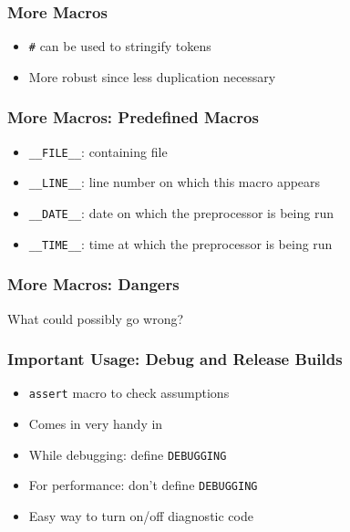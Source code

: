 \documentclass{../ucll-slides}
\begin{document}
\begin{frame}
  \frametitle{More Macros}
  \begin{itemize}
    \item {\tt \#} can be used to stringify tokens
    \item More robust since less duplication necessary
  \end{itemize}
  \begin{overprint}
  \end{overprint}
\end{frame}

\begin{frame}
  \frametitle{More Macros: Predefined Macros}
  \begin{itemize}
    \item {\tt \_\_FILE\_\_}: containing file
    \item {\tt \_\_LINE\_\_}: line number on which this macro appears
    \item {\tt \_\_DATE\_\_}: date on which the preprocessor is being run
    \item {\tt \_\_TIME\_\_}: time at which the preprocessor is being run
  \end{itemize}
  \begin{overprint}
  \end{overprint}
\end{frame}

\begin{frame}
  \frametitle{More Macros: Dangers}
  \begin{center}
    What could possibly go wrong?
  \end{center}
  \vskip1cm
  \begin{overprint}
  \end{overprint}
\end{frame}

\begin{frame}
  \frametitle{Important Usage: Debug and Release Builds}
  \begin{itemize}
    \item {\tt assert} macro to check assumptions
    \item Comes in very handy in  \cpp
    \item While debugging: define {\tt DEBUGGING}
    \item For performance: don't define {\tt DEBUGGING}
    \item Easy way to turn on/off diagnostic code
  \end{itemize}
\end{frame}
\end{document}
